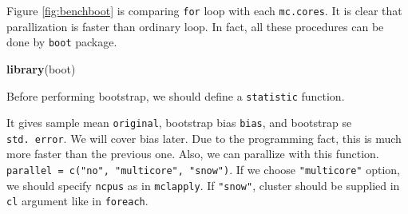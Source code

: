 \documentclass[]{book}
\newenvironment{Shaded}{\begin{snugshade}}{\end{snugshade}}
\newcommand{\CommentTok}[1]{\textcolor[rgb]{0.56,0.35,0.01}{\textit{#1}}}
\newcommand{\ControlFlowTok}[1]{\textcolor[rgb]{0.13,0.29,0.53}{\textbf{#1}}}
\newcommand{\DataTypeTok}[1]{\textcolor[rgb]{0.13,0.29,0.53}{#1}}
\newcommand{\KeywordTok}[1]{\textcolor[rgb]{0.13,0.29,0.53}{\textbf{#1}}}
\newcommand{\NormalTok}[1]{#1}
\newcommand{\OperatorTok}[1]{\textcolor[rgb]{0.81,0.36,0.00}{\textbf{#1}}}
\newcommand{\StringTok}[1]{\textcolor[rgb]{0.31,0.60,0.02}{#1}}
\theoremstyle{definition}
\theoremstyle{definition}
\theoremstyle{definition}
\theoremstyle{remark}
\begin{document}
Figure \ref{fig:benchboot} is comparing \texttt{for} loop with each \texttt{mc.cores}. It is clear that parallization is faster than ordinary loop. In fact, all these procedures can be done by \texttt{boot} package.

\begin{Shaded}
\begin{Highlighting}[]
\KeywordTok{library}\NormalTok{(boot)}
\end{Highlighting}
\end{Shaded}

Before performing bootstrap, we should define a \texttt{statistic} function.

\begin{Shaded}
\end{Shaded}

It gives sample mean \texttt{original}, bootstrap bias \texttt{bias}, and bootstrap se \texttt{std.\ error}. We will cover bias later. Due to the programming fact, this is much more faster than the previous one. Also, we can parallize with this function. \texttt{parallel\ =\ c("no",\ "multicore",\ "snow")}. If we choose \texttt{"multicore"} option, we should specify \texttt{ncpus} as in \texttt{mclapply}. If \texttt{"snow"}, cluster should be supplied in \texttt{cl} argument like in \texttt{foreach}.

\begin{Shaded}
\end{Shaded}
\end{document}
